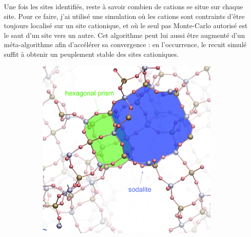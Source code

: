 \documentclass[thesis]{subfiles}
\begin{document}
\begin{otherlanguage}{french}
Une fois les sites identifiés, reste à savoir combien de cations se situe sur chaque site. Pour ce faire, j'ai utilisé une simulation où les cations sont contraints d'être toujours localisé sur un site cationique, et où le seul pas Monte-Carlo autorisé est le saut d'un site vers un autre. Cet algorithme peut lui aussi être augmenté d'un méta-algorithme afin d'accélérer sa convergence : en l'occurrence, le recuit simulé suffit à obtenir un peuplement stable des sites cationiques.

\begin{figure}[ht]
	\centering
	\hfill\begin{subfigure}{0.45\columnwidth}
		\centering
		\includegraphics[width=0.95\columnwidth]{figures/cations/FAU1_cages_text.jpg}
	\end{subfigure}\hfill%
	\begin{subfigure}{0.45\columnwidth}
		\centering

\end{subfigure}
\end{figure}
\end{otherlanguage}
\end{document}
